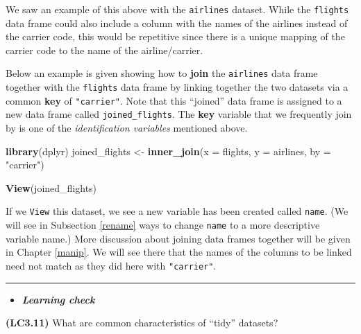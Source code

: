 \documentclass[]{tufte-book}
\newenvironment{Shaded}{\begin{snugshade}}{\end{snugshade}}
\newcommand{\KeywordTok}[1]{\textcolor[rgb]{0.13,0.29,0.53}{\textbf{{#1}}}}
\newcommand{\DataTypeTok}[1]{\textcolor[rgb]{0.13,0.29,0.53}{{#1}}}
\newcommand{\StringTok}[1]{\textcolor[rgb]{0.31,0.60,0.02}{{#1}}}
\newcommand{\NormalTok}[1]{{#1}}
\let\oldrule=\rule
\renewcommand{\rule}[1]{\oldrule{\linewidth}}
\newenvironment{rmdblock}[1]
  {\begin{shaded*}
  \begin{itemize}
  \renewcommand{\labelitemi}{
    \raisebox{-.7\height}[0pt][0pt]{
    }
  }
  \item
  }
  {
  \end{itemize}
  \end{shaded*}
  }
\newenvironment{learncheck}
  {\begin{rmdblock}{warning}}
  {\end{rmdblock}}
\begin{document}
We saw an example of this above with the \texttt{airlines} dataset.
While the \texttt{flights} data frame could also include a column with
the names of the airlines instead of the carrier code, this would be
repetitive since there is a unique mapping of the carrier code to the
name of the airline/carrier.

Below an example is given showing how to \textbf{join} the
\texttt{airlines} data frame together with the \texttt{flights} data
frame by linking together the two datasets via a common \textbf{key} of
\texttt{"carrier"}. Note that this ``joined'' data frame is assigned to
a new data frame called \texttt{joined\_flights}. The \textbf{key}
variable that we frequently join by is one of the \emph{identification
variables} mentioned above.

\begin{Shaded}
\begin{Highlighting}[]
\KeywordTok{library}\NormalTok{(dplyr)}
\NormalTok{joined_flights <-}\StringTok{ }\KeywordTok{inner_join}\NormalTok{(}\DataTypeTok{x =} \NormalTok{flights, }\DataTypeTok{y =} \NormalTok{airlines, }\DataTypeTok{by =} \StringTok{"carrier"}\NormalTok{)}
\end{Highlighting}
\end{Shaded}

\begin{Shaded}
\begin{Highlighting}[]
\KeywordTok{View}\NormalTok{(joined_flights)}
\end{Highlighting}
\end{Shaded}

If we \texttt{View} this dataset, we see a new variable has been created
called \texttt{name}. (We will see in Subsection \ref{rename} ways to
change \texttt{name} to a more descriptive variable name.) More
discussion about joining data frames together will be given in Chapter
\ref{manip}. We will see there that the names of the columns to be
linked need not match as they did here with \texttt{"carrier"}.

\begin{center}\rule{0.5\linewidth}{\linethickness}\end{center}

\begin{learncheck}
\textbf{\emph{Learning check}}
\end{learncheck}

\textbf{(LC3.11)} What are common characteristics of ``tidy'' datasets?
\end{document}
